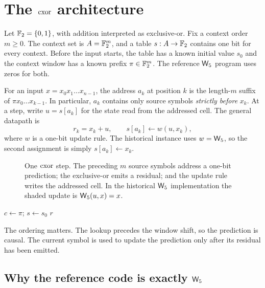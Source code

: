 \section{The \texorpdfstring{$\mathrm{cxor}$}{cxor} architecture}\label{sec:cta}

Let $\mathbb{F}_2=\{0,1\}$, with addition interpreted as exclusive-or.  Fix a context order $m\ge0$.
The context set is $A=\mathbb{F}_2^m$, and a table $s:A\to\mathbb{F}_2$ contains one bit for every context.  Before
the input starts, the table has a known initial value $s_0$ and the context window has a known
prefix $\pi\in\mathbb{F}_2^m$.  The reference $\mathsf{W}_{5}$ program uses zeros for both.

For an input $x=x_0x_1\dots x_{n-1}$, the address $a_k$ at position $k$ is the length-$m$ suffix
of $\pi x_0\dots x_{k-1}$.  In particular, $a_k$ contains only source symbols \emph{strictly
before} $x_k$.  At a step, write $u=s[a_k]$ for the state read from the addressed cell.  The
general datapath is
\begin{equation}\label{eq:machine-step}
  r_k=x_k+u,
  \qquad
  s[a_k]\leftarrow w(u,x_k),
\end{equation}
where $w$ is a one-bit update rule.  The historical instance uses $w=\W5$, so the second
assignment is simply $s[a_k]\leftarrow x_k$.

\begin{figure}[ht]
  \centering
  
  \caption{One $\mathrm{cxor}$ step.  The preceding $m$ source symbols address a one-bit prediction; the
  exclusive-or emits a residual; and the update rule writes the addressed cell.  In the
  historical $\mathsf{W}_{5}$ implementation the shaded update is $\mathsf{W}_{5}(u,x)=x$.}
  \label{fig:cxor-datapath}
\end{figure}

\begin{algorithm}[ht]
\caption{$\cxor_w$; choose $w=\W5$ for the historical instance}\label{alg:cxor}
\DontPrintSemicolon
$c\leftarrow\pi$; $s\leftarrow s_0$\;
\Return $r$
\end{algorithm}

The ordering matters.  The lookup precedes the window shift, so the prediction is causal.  The
current symbol is used to update the prediction only after its residual has been emitted.

\subsection{Why the reference code is exactly \texorpdfstring{$\mathsf{W}_{5}$}{W5}}

